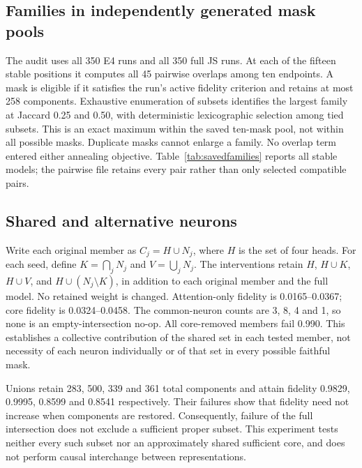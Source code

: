 \documentclass[10pt]{article}
\begin{document}
\subsection{Families in independently generated mask pools}
The audit uses all 350 E4 runs and all 350 full JS runs. At each of the fifteen stable positions it computes all 45 pairwise overlaps among ten endpoints. A mask is eligible if it satisfies the run's active fidelity criterion and retains at most 258 components. Exhaustive enumeration of subsets identifies the largest family at Jaccard 0.25 and 0.50, with deterministic lexicographic selection among tied subsets. This is an exact maximum within the saved ten-mask pool, not within all possible masks. Duplicate masks cannot enlarge a family. No overlap term entered either annealing objective. Table~\ref{tab:savedfamilies} reports all stable models; the pairwise file retains every pair rather than only selected compatible pairs.


\subsection{Shared and alternative neurons}
Write each original member as $C_j=H\cup N_j$, where $H$ is the set of four heads. For each seed, define $K=\bigcap_j N_j$ and $V=\bigcup_j N_j$. The interventions retain $H$, $H\cup K$, $H\cup V$, and $H\cup(N_j\setminus K)$, in addition to each original member and the full model. No retained weight is changed. Attention-only fidelity is 0.0165--0.0367; core fidelity is 0.0324--0.0458. The common-neuron counts are 3, 8, 4 and 1, so none is an empty-intersection no-op. All core-removed members fail 0.990. This establishes a collective contribution of the shared set in each tested member, not necessity of each neuron individually or of that set in every possible faithful mask.

Unions retain 283, 500, 339 and 361 total components and attain fidelity 0.9829, 0.9995, 0.8599 and 0.8541 respectively. Their failures show that fidelity need not increase when components are restored. Consequently, failure of the full intersection does not exclude a sufficient proper subset. This experiment tests neither every such subset nor an approximately shared sufficient core, and does not perform causal interchange between representations.
\end{document}
